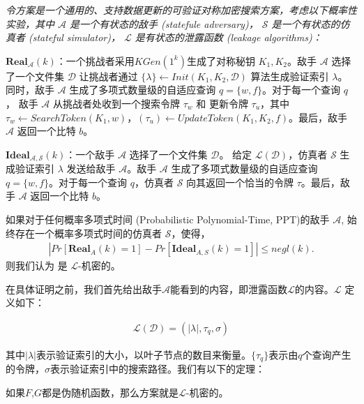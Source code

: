 \begin{definition}
  {\itshape
      令方案\single 是一个通用的、支持数据更新的可验证对称加密搜索方案，考虑以下概率性实验，其中 $\mathcal{A}$ 是一个有状态的敌手 (statefule adversary)， $\mathcal{S}$ 是一个有状态的仿真者 (stateful simulator)， $\mathcal{L}$ 是有状态的泄露函数 (leakage algorithms)：

      $\mathbf{Real}_\mathcal{A}(k)$：一个挑战者采用$KGen(1^k)$生成了对称秘钥 $K_1,K_2$。敌手 $\mathcal{A}$ 选择了一个文件集 $\mathcal{D}$ 让挑战者通过 $\{\lambda\} \leftarrow Init(K_1,K_2,\mathcal{D})$ 算法生成验证索引 $\lambda$。同时，敌手 $\mathcal{A}$ 生成了多项式数量级的自适应查询 $q = \{w,f\}$。对于每一个查询 $q$， 敌手 $\mathcal{A}$ 从挑战者处收到一个搜索令牌 $\tau_w$ 和 更新令牌 $\tau_u$，其中 $\tau_w \leftarrow SearchToken(K_1,w)$，$(\tau_u) \leftarrow UpdateToken(K_1,K_2,f)$。最后，敌手 $\mathcal{A}$ 返回一个比特 $b$。

      $\mathbf{Ideal}_\mathcal{A,S}(k)$：一个敌手 $\mathcal{A}$ 选择了一个文件集 $\mathcal{D}$。 给定 $\mathcal{L}(\mathcal{D})$，仿真者 $\mathcal{S}$ 生成验证索引 $\lambda$ 发送给敌手 $\mathcal{A}$。敌手 $\mathcal{A}$ 生成了多项式数量级的自适应查询 $q = \{w,f\}$。对于每一个查询 $q$，仿真者 $\mathcal{S}$ 向其返回一个恰当的令牌 $\tau$。最后，敌手 $\mathcal{A}$ 返回一个比特 $b$。

      如果对于任何概率多项式时间 (Probabilistic Polynomial-Time, PPT)的敌手 $\mathcal{A}$, 始终存在一个概率多项式时间的仿真者 $\mathcal{S}$，使得，
      \begin{align}
        |Pr[\mathbf{Real}_A(k) = 1] - Pr[\mathbf{Ideal}_{A,S}(k) = 1]| \leq negl(k).
      \end{align}
      则我们认为 \single 是 $\mathcal{L}$-机密的。
  }
\end{definition}

在具体证明之前，我们首先给出敌手$\mathcal{A}$能看到的内容，即泄露函数$\mathcal{L}$的内容。$\mathcal{L}$ 定义如下：

\begin{align}
  \mathcal{L}(\mathcal{D})=(|\lambda|,{\tau}_q,{\sigma})
\end{align}

其中$|\lambda|$表示验证索引的大小，以叶子节点的数目来衡量。$\{\tau_q\}$表示由$q$个查询产生的令牌，$\sigma$表示验证索引中的搜索路径。我们有以下的定理：

\begin{theorem}
    如果$F$,$G$都是伪随机函数，那么方案\single 就是$\mathcal{L}$-机密的。
\end{theorem}

